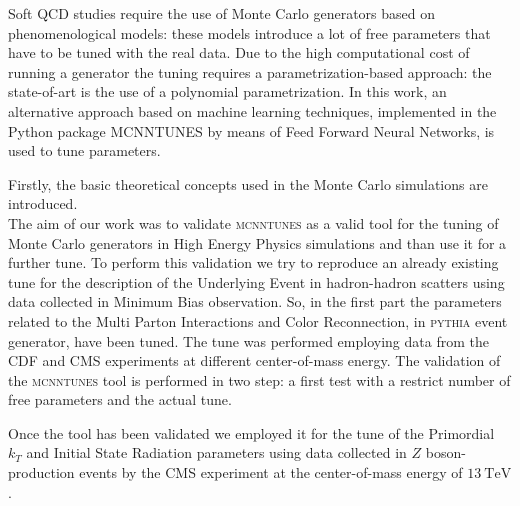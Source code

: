Soft QCD studies require the use of Monte Carlo generators based on phenomenological models: these models introduce a lot of free parameters that have to be tuned with the real data.
Due to the high computational cost of running a generator the tuning requires a parametrization-based approach: the state-of-art is the use of a polynomial parametrization. 
In this work, an alternative approach based on machine learning techniques, implemented in the Python package MCNNTUNES by means of Feed Forward Neural Networks, is used to tune parameters. 

\medskip

Firstly, the basic theoretical concepts used in the Monte Carlo simulations are introduced.
\\
The aim of our work was to validate \textsc{mcnntunes} as a valid tool for the tuning of Monte Carlo generators in High Energy Physics simulations and than use it for a further tune.
To perform this validation we try to reproduce an already existing tune for the description of the Underlying Event in hadron-hadron scatters using data collected in Minimum Bias observation.
So, in the first part the parameters related to the Multi Parton Interactions and Color Reconnection, in \textsc{pythia} event generator, have been tuned. The tune was performed employing data from the CDF and CMS experiments at different center-of-mass energy. The validation of the \textsc{mcnntunes} tool is performed in two step: a first test with a restrict number of free parameters and the actual tune. 

\medskip

Once the tool has been validated we employed it for the tune of the Primordial $k_T$ and Initial State Radiation parameters using data collected in $Z$ boson-production events by the CMS experiment at the center-of-mass energy of $13\ \mathrm{TeV}$. 


%
